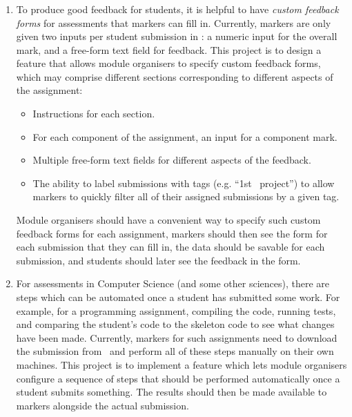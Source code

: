 \subsubsection{\higherEdFullName}

\begin{enumerate}
    \item To produce good feedback for students, it is helpful to have \emph{custom feedback forms} for assessments that markers can fill in. Currently, markers are only given two inputs per student submission in \higherEdCSRS: a numeric input for the overall mark, and a free-form text field for feedback. This project is to design a feature that allows module organisers to specify custom feedback forms, which may comprise different sections corresponding to different aspects of the assignment:
    \begin{itemize}
        \item Instructions for each section.
        \item For each component of the assignment, an input for a component mark.
        \item Multiple free-form text fields for different aspects of the feedback.
        \item The ability to label submissions with tags (e.g. ``1st \ssh\ project'') to allow markers to quickly filter all of their assigned submissions by a given tag.
    \end{itemize}
    Module organisers should have a convenient way to specify such custom feedback forms for each assignment, markers should then see the form for each submission that they can fill in, the data should be savable for each submission, and students should later see the feedback in the form.

    \item For assessments in Computer Science (and some other sciences), there are steps which can be automated once a student has submitted some work. For example, for a programming assignment, compiling the code, running tests, and comparing the student's code to the skeleton code to see what changes have been made. Currently, markers for such assignments need to download the submission from \higherEdCSRS\ and perform all of these steps manually on their own machines. This project is to implement a feature which lets module organisers configure a sequence of steps that should be performed automatically once a student submits something. The results should then be made available to markers alongside the actual submission.


\end{enumerate}
